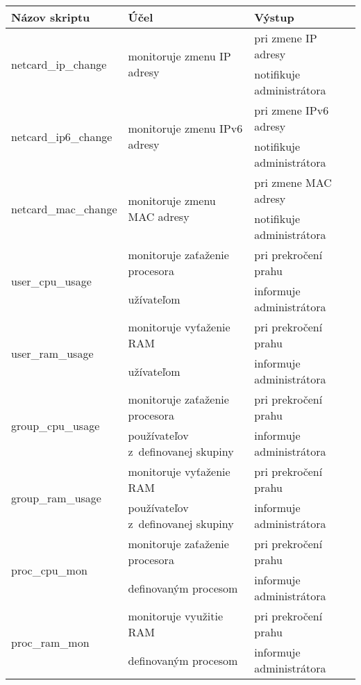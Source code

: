 \noindent \begin{tabular}{ | l | l | l | }
	\hline
	Názov skriptu & Účel & Výstup \\ \hline
	
	\multirow{2}{*}{netcard\_ip\_change} & \multirow{2}{*}{monitoruje zmenu IP adresy} & pri zmene IP adresy \\
	&  & notifikuje administrátora \\ \hline
	
	\multirow{2}{*}{netcard\_ip6\_change} & \multirow{2}{*}{monitoruje zmenu IPv6 adresy} & pri zmene IPv6 adresy \\
	&  & notifikuje administrátora \\ \hline
	
	\multirow{2}{*}{netcard\_mac\_change} & \multirow{2}{*}{monitoruje zmenu MAC adresy} & pri zmene MAC adresy \\
	&  & notifikuje administrátora \\ \hline
	
	
	\multirow{2}{*}{user\_cpu\_usage} & monitoruje zaťaženie procesora & pri prekročení prahu\\
	& užívateľom & informuje administrátora\\ \hline
	
	\multirow{2}{*}{user\_ram\_usage} & monitoruje vyťaženie RAM & pri prekročení prahu\\
    & užívateľom & informuje administrátora\\ \hline
    
    
    \multirow{2}{*}{group\_cpu\_usage} & monitoruje zaťaženie procesora & pri prekročení prahu\\
    & používateľov z~definovanej skupiny & informuje administrátora\\ \hline
    
    \multirow{2}{*}{group\_ram\_usage} & monitoruje vyťaženie RAM & pri prekročení prahu\\
    & používateľov z~definovanej skupiny & informuje administrátora\\ \hline
	
	
	\multirow{2}{*}{proc\_cpu\_mon} & monitoruje zaťaženie procesora & pri prekročení prahu\\
	& definovaným procesom &informuje administrátora\\ \hline
	
    \multirow{2}{*}{proc\_ram\_mon} & monitoruje využitie RAM & pri prekročení prahu\\
	& definovaným procesom &informuje administrátora\\ \hline
	

\end{tabular}
